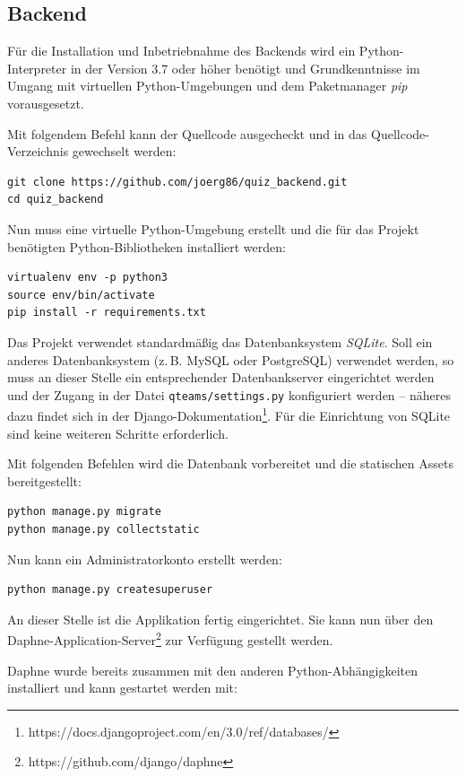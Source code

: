 \documentclass[a4paper,11pt,listof=numbered,glossary=totoc,parskip=half,toc=bib]{scrreprt}
\begin{document}
\begin{appendices}
	\section{Backend}
	Für die Installation und Inbetriebnahme des Backends wird ein Python-Interpreter in der Version 3.7 oder höher benötigt und Grundkenntnisse im Umgang mit virtuellen Python-Umgebungen und dem Paketmanager \textit{pip} vorausgesetzt.
	
	Mit folgendem Befehl kann der Quellcode ausgecheckt und in das Quellcode-Verzeichnis gewechselt werden:		
	\begin{verbatim}
git clone https://github.com/joerg86/quiz_backend.git
cd quiz_backend
	\end{verbatim}
	
	Nun muss eine virtuelle Python-Umgebung erstellt und die für das Projekt benötigten Python-Bibliotheken installiert werden:
	\begin{verbatim}
virtualenv env -p python3
source env/bin/activate
pip install -r requirements.txt
	\end{verbatim}
	
	Das Projekt verwendet standardmäßig das Datenbanksystem \textit{SQLite}. Soll ein anderes Datenbanksystem (z.\,B. MySQL oder PostgreSQL) verwendet werden, so muss an dieser Stelle ein entsprechender Datenbankserver eingerichtet werden und der Zugang in der Datei \texttt{qteams/settings.py} konfiguriert werden -- näheres dazu findet sich in der Django-Dokumentation\footnote{https://docs.djangoproject.com/en/3.0/ref/databases/}. Für die Einrichtung von SQLite sind keine weiteren Schritte erforderlich.
	
	Mit folgenden Befehlen wird die Datenbank vorbereitet und die statischen Assets bereitgestellt:
	
	\begin{verbatim}
python manage.py migrate
python manage.py collectstatic
	\end{verbatim}
	
	Nun kann ein Administratorkonto erstellt werden:
	
	\begin{verbatim}
python manage.py createsuperuser
	\end{verbatim}
	
	An dieser Stelle ist die Applikation fertig eingerichtet. Sie kann nun über den Daphne-Application-Server\footnote{https://github.com/django/daphne} zur Verfügung gestellt werden. 
	
	Daphne wurde bereits zusammen mit den anderen Python-Abhängigkeiten installiert und kann gestartet werden mit:
	

\end{appendices}
\end{document}
